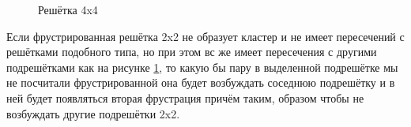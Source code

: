 \documentclass[utf8, babel, sor, jor, amsmath,amssymb, reprint]{elsarticle} %
\begin{document}
\begin{figure}[h]
	\centering
	\caption{Решётка 4x4}
	\label{fig:4x4}
\end{figure}

Если фрустрированная решётка 2x2 не образует кластер и не имеет пересечений с решётками подобного типа, но при этом вс же имеет пересечения с другими подрешётками как на  рисунке \ref{fig:4x4}, то какую бы пару в выделенной подрешётке мы не посчитали фрустрированной она будет возбуждать соседнюю подрешётку и в ней будет появляться вторая фрустрация причём таким, образом чтобы не возбуждать другие подрешётки 2x2. 
\end{document}
